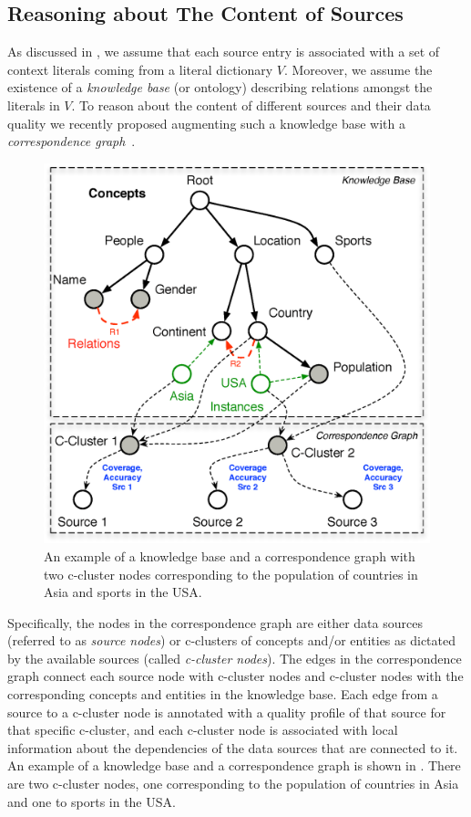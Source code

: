 \documentclass{vldb}
\begin{document}
\subsection{Reasoning about The Content of Sources}
\label{sec:reasoning}
As discussed in , we assume that each source entry is associated with a set of context literals coming from a literal dictionary $V$. Moreover, we assume the existence of a {\em knowledge base} (or ontology) describing relations amongst the literals in $V$.  To reason about the content of different sources and their data quality we recently proposed augmenting such a knowledge base with a {\em correspondence graph}~\cite{rekatsinas:2015}. 
\begin{figure}
	\begin{center}
	\includegraphics[clip,scale=0.25]{fig/kgcg}
	\caption{An example of a knowledge base and a correspondence graph with two c-cluster nodes corresponding to the population of countries in Asia and sports in the USA.}
	\label{fig:kgcg}
	\vspace{-20pt}
	\end{center}
\end{figure}
Specifically, the nodes in the correspondence graph are either data sources (referred to as {\em source nodes}) or c-clusters of concepts and/or entities as dictated by the available sources (called {\em c-cluster nodes}). The edges in the correspondence graph connect each source node with c-cluster nodes and c-cluster nodes with the corresponding concepts and entities in the knowledge base.  Each edge from a source to a c-cluster node is annotated with a quality profile of that source for that specific c-cluster, and each c-cluster node is associated with local information about the dependencies of the data sources that are connected to it. An example of a knowledge base and a correspondence graph is shown in . There are two c-cluster nodes, one corresponding to the population of countries in Asia and one to sports in the USA. 
\end{document}
